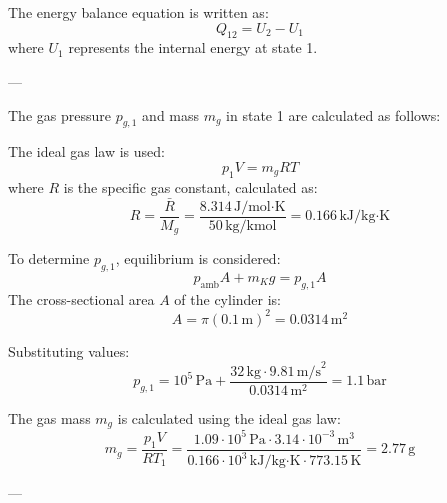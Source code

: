 The energy balance equation is written as:  
\[
Q_{12} = U_{2} - U_{1}
\]  
where \( U_1 \) represents the internal energy at state 1.

---

The gas pressure \( p_{g,1} \) and mass \( m_g \) in state 1 are calculated as follows:  

The ideal gas law is used:  
\[
p_1 V = m_g R T
\]  
where \( R \) is the specific gas constant, calculated as:  
\[
R = \frac{\bar{R}}{M_g} = \frac{8.314 \, \text{J/mol·K}}{50 \, \text{kg/kmol}} = 0.166 \, \text{kJ/kg·K}
\]  

To determine \( p_{g,1} \), equilibrium is considered:  
\[
p_{\text{amb}} A + m_K g = p_{g,1} A
\]  
The cross-sectional area \( A \) of the cylinder is:  
\[
A = \pi \left( 0.1 \, \text{m} \right)^2 = 0.0314 \, \text{m}^2
\]  

Substituting values:  
\[
p_{g,1} = 10^5 \, \text{Pa} + \frac{32 \, \text{kg} \cdot 9.81 \, \text{m/s}^2}{0.0314 \, \text{m}^2} = 1.1 \, \text{bar}
\]  

The gas mass \( m_g \) is calculated using the ideal gas law:  
\[
m_g = \frac{p_1 V}{R T_1} = \frac{1.09 \cdot 10^5 \, \text{Pa} \cdot 3.14 \cdot 10^{-3} \, \text{m}^3}{0.166 \cdot 10^3 \, \text{kJ/kg·K} \cdot 773.15 \, \text{K}} = 2.77 \, \text{g}
\]  

---